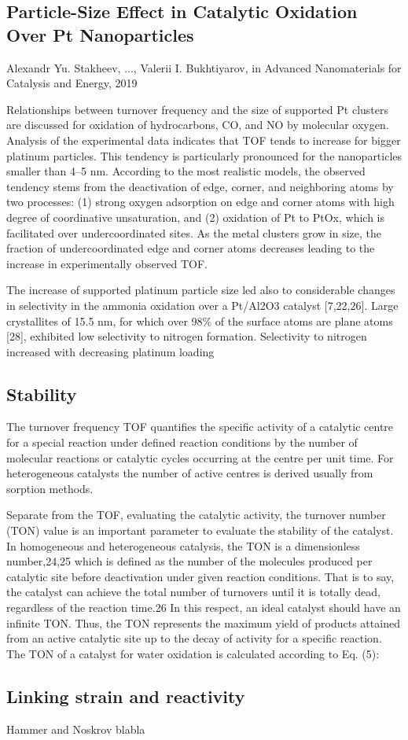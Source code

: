 \subsection{Particle-Size Effect in Catalytic Oxidation Over Pt Nanoparticles}

Alexandr Yu. Stakheev, ..., Valerii I. Bukhtiyarov, in Advanced Nanomaterials for Catalysis and Energy, 2019

Relationships between turnover frequency and the size of supported Pt clusters are discussed for oxidation of hydrocarbons, CO, and NO by molecular oxygen. Analysis of the experimental data indicates that TOF tends to increase for bigger platinum particles. This tendency is particularly pronounced for the nanoparticles smaller than 4–5 nm. According to the most realistic models, the observed tendency stems from the deactivation of edge, corner, and neighboring atoms by two processes: (1) strong oxygen adsorption on edge and corner atoms with high degree of coordinative unsaturation, and (2) oxidation of Pt to PtOx, which is facilitated over undercoordinated sites. As the metal clusters grow in size, the fraction of undercoordinated edge and corner atoms decreases leading to the increase in experimentally observed TOF.


The increase of supported platinum particle size led also
to considerable changes in selectivity in the ammonia oxidation over a Pt/Al2O3 catalyst [7,22,26]. Large crystallites of 15.5 nm, for which over 98\% of the surface atoms are plane atoms [28], exhibited low selectivity to nitrogen formation. Selectivity to nitrogen increased with decreasing platinum loading

\subsection{Stability}

The turnover frequency TOF quantifies the specific activity of a catalytic centre for a special reaction under defined reaction conditions by the number of molecular reactions or catalytic cycles occurring at the centre per unit time. For heterogeneous catalysts the number of active centres is derived usually from sorption methods.

Separate from the TOF, evaluating the catalytic activity, the turnover number (TON) value is an important parameter to evaluate the stability of the catalyst. In homogeneous and heterogeneous catalysis, the TON is a dimensionless number,24,25 which is defined as the number of the molecules produced per catalytic site before deactivation under given reaction conditions. That is to say, the catalyst can achieve the total number of turnovers until it is totally dead, regardless of the reaction time.26 In this respect, an ideal catalyst should have an infinite TON. Thus, the TON represents the maximum yield of products attained from an active catalytic site up to the decay of activity for a specific reaction. The TON of a catalyst for water oxidation is calculated according to Eq. (5):


\subsection{Linking strain and reactivity}

Hammer and Noskrov blabla
